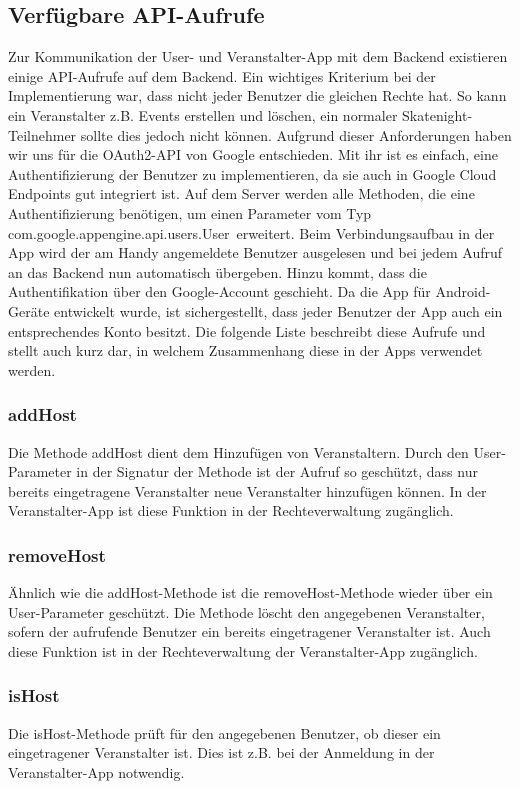 \subsection{Verfügbare API-Aufrufe}

Zur Kommunikation der User- und Veranstalter-App mit dem Backend existieren einige API-Aufrufe auf dem Backend. Ein wichtiges Kriterium bei der Implementierung war, dass nicht jeder Benutzer die gleichen Rechte hat. So kann ein Veranstalter z.B. Events erstellen und löschen, ein normaler Skatenight-Teilnehmer sollte dies jedoch nicht können. Aufgrund dieser Anforderungen haben wir uns für die OAuth2-API von Google entschieden. Mit ihr ist es einfach, eine Authentifizierung der Benutzer zu implementieren, da sie auch in Google Cloud Endpoints gut integriert ist. Auf dem Server werden alle Methoden, die eine Authentifizierung benötigen, um einen Parameter vom Typ \glqq com.google.appengine.api.users.User\grqq\ erweitert. Beim Verbindungsaufbau in der App wird der am Handy angemeldete Benutzer ausgelesen und bei jedem Aufruf an das Backend nun automatisch übergeben. Hinzu kommt, dass die Authentifikation über den Google-Account geschieht. Da die App für Android-Geräte entwickelt wurde, ist sichergestellt, dass jeder Benutzer der App auch ein entsprechendes Konto besitzt.
Die folgende Liste beschreibt diese Aufrufe und stellt auch kurz dar, in welchem Zusammenhang diese in der Apps verwendet werden.

\subsubsection*{addHost}
Die Methode addHost dient dem Hinzufügen von Veranstaltern. Durch den User-Parameter in der Signatur der Methode ist der Aufruf so geschützt, dass nur bereits eingetragene Veranstalter neue Veranstalter hinzufügen können. In der Veranstalter-App ist diese Funktion in der Rechteverwaltung zugänglich.

\subsubsection*{removeHost}
Ähnlich wie die addHost-Methode ist die removeHost-Methode wieder über ein User-Parameter geschützt. Die Methode löscht den angegebenen Veranstalter, sofern der aufrufende Benutzer ein bereits eingetragener Veranstalter ist. Auch diese Funktion ist in der Rechteverwaltung der Veranstalter-App zugänglich.

\subsubsection*{isHost}
Die isHost-Methode prüft für den angegebenen Benutzer, ob dieser ein eingetragener Veranstalter ist. Dies ist z.B. bei der Anmeldung in der Veranstalter-App notwendig.

